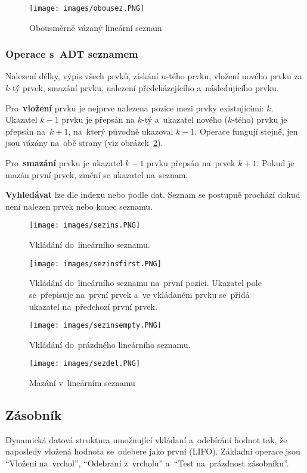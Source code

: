 \begin{figure}[ht]
	\centering
	\texttt{[image: images/obousez.PNG]}
	\caption{Obousměrně vázaný lineární seznam}
	\label{obousez}
\end{figure}

\subsubsection{Operace s~ADT seznamem}

Nalezení délky, výpis všech prvků, získání \( n \)-tého prvku, vložení nového prvku za \( k \)-tý prvek, smazání prvku, nalezení předcházejícího a~následujícího prvku.

Pro~\textbf{vložení} prvku je nejprve nalezena pozice mezi prvky existujícími: \( k \). Ukazatel \( k-1 \) prvku je přepsán na \( k \)-tý a~ukazatel nového (\( k \)-tého) prvku je přepsán na~\( k+1 \), na~který původně ukazoval \( k-1 \). Operace fungují stejně, jen jsou vázány na~obě strany (viz obrázek~\ref{sezins}).

Pro~\textbf{smazání} prvku je ukazatel \( k-1 \) prvku přepsán na~prvek \( k+1 \). Pokud je mazán první prvek, změní se ukazatel na~seznam.

\textbf{Vyhledávat} lze dle indexu nebo podle dat. Seznam se postupně prochází dokud není nalezen prvek nebo konec seznamu.

\begin{figure}[ht]
	\centering
	\texttt{[image: images/sezins.PNG]}
	\caption{Vkládání do~lineárního seznamu.}
	\label{sezins}

	\texttt{[image: images/sezinsfirst.PNG]}
	\caption{Vkládání do~lineárního seznamu na~první pozici. Ukazatel pole se~přepisuje na~první prvek a~ve vkládaném prvku se~přidá ukazatel na~předchozí první prvek.}

	\texttt{[image: images/sezinsempty.PNG]}
	\caption{Vkládání do~prázdného lineárního seznamu.}

	\texttt{[image: images/sezdel.PNG]}
	\caption{Mazání v~lineárním seznamu}
\end{figure}

\subsection{Zásobník}

Dynamická datová struktura umožnující vkládaní a~odebírání hodnot tak, že naposledy vložená hodnota se~odebere jako první (LIFO). Základní operace jsou \enquote{Vložení na~vrchol}, \enquote{Odebraní z~vrcholu} a~\enquote{Test na~prázdnost zásobníku}.

